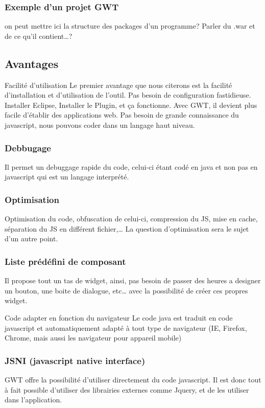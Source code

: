 \subsubsection{Exemple d'un projet GWT}
on peut mettre ici la structure des packages d'un programme? Parler du .war et de ce qu'il contient…?
	

\subsection{Avantages}
Facilité d'utilisation
Le premier avantage que nous citerons est la facilité d'installation et d'utilisation de l'outil. Pas besoin de configuration fastidieuse. Installer Eclipse, Installer le Plugin, et ça fonctionne.
Avec GWT, il devient plus facile d'établir des applications web. Pas besoin de grande connaissance du javascript, nous pouvons coder dans un langage haut niveau.

\subsubsection{Debbugage}
Il permet un debuggage rapide du code, celui-ci étant codé en java et non pas en javascript qui est un langage interprété.

\subsubsection{Optimisation}
Optimisation du code, obfuscation de celui-ci, compression du JS, mise en cache, séparation du JS en différent fichier,… La question d'optimisation sera le sujet d'un autre point.

\subsubsection{Liste prédéfini de composant}
Il propose tout un tas de widget, ainsi, pas besoin de passer des heures a designer un bouton, une boite de dialogue, etc… avec la possibilité de créer ces propres widget.

Code adapter en fonction du navigateur
Le code java est traduit en code javascript et automatiquement adapté à tout type de navigateur (IE, Firefox, Chrome, mais aussi les navigateur pour appareil mobile)

\subsubsection{JSNI (javascript native interface)}
GWT offre la possibilité d'utiliser directement du code javascript. Il est donc tout à fait possible d'utiliser des librairies externes comme Jquery, et de les utiliser dans l'application.

